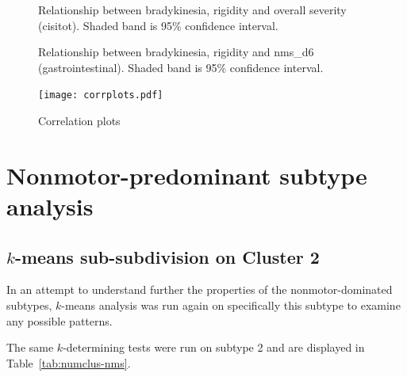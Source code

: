 \documentclass[10pt]{article}
\begin{document}
\begin{multicols}{2}
\begin{figure}[H]
  \centering

  \caption{Relationship between \protect{} bradykinesia,
  \protect{} rigidity and overall severity (cisitot). Shaded band
is 95\% confidence interval.}
  \label{fig:corrxy-br}
\end{figure}

\begin{figure}[H]
  \centering

  \caption{Relationship between \protect{} bradykinesia,
  \protect{} rigidity and nms\_d6 (gastrointestinal). Shaded band
is 95\% confidence interval.}
  \label{fig:corrxy-d6}
\end{figure}
\begin{figure}[H]
  \centering
  \texttt{[image: corrplots.pdf]}
  \caption{Correlation plots}
  \label{fig:corrplots}
\end{figure}

\section{Nonmotor-predominant subtype analysis}
\subsection{$k$-means sub-subdivision on Cluster 2}

In an attempt to understand further the properties of the nonmotor-dominated
subtypes, $k$-means analysis was run again on specifically this subtype to
examine any possible patterns.

The same $k$-determining tests were run on subtype 2 and are displayed
in Table~\ref{tab:numclus-nms}.


\end{multicols}
\end{document}
